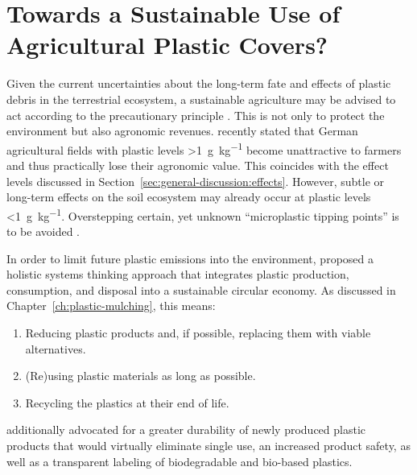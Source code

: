 \section{Towards a Sustainable Use of Agricultural Plastic Covers?}
\label{sec:general-discussion:sustainable}

Given the current uncertainties about the long-term fate and effects of plastic debris in the terrestrial ecosystem, a sustainable agriculture may be advised to act according to the precautionary principle \citep{RhodesPlastic2018,BackhausMicroplastics2020,MollerFinding2020}. This is not only to protect the environment but also agronomic revenues.  recently stated that German agricultural fields with plastic levels \SI{>1}{\gram\per\kilo\gram} become unattractive to farmers and thus practically lose their agronomic value. This coincides with the effect levels discussed in Section~\ref{sec:general-discussion:effects}. However, subtle or long-term effects on the soil ecosystem may already occur at plastic levels \SI{<1}{\gram\per\kilo\gram}. Overstepping certain, yet unknown ``microplastic tipping points'' is to be avoided \citep{QiBehavior2020}.

In order to limit future plastic emissions into the environment, \citet{ThompsonPlastics2009,ScalengheResource2018,RhodesPlastic2018} proposed a holistic systems thinking approach that integrates plastic production, consumption, and disposal into a sustainable circular economy. As discussed in Chapter~\ref{ch:plastic-mulching}, this means:

\begin{enumerate}
	\item Reducing plastic products and, if possible, replacing them with viable alternatives.
	\item (Re)using plastic materials as long as possible.
	\item Recycling the plastics at their end of life.
\end{enumerate}

 additionally advocated for a greater durability of newly produced plastic products that would virtually eliminate single use, an increased product safety, as well as a transparent labeling of biodegradable and bio-based plastics.


